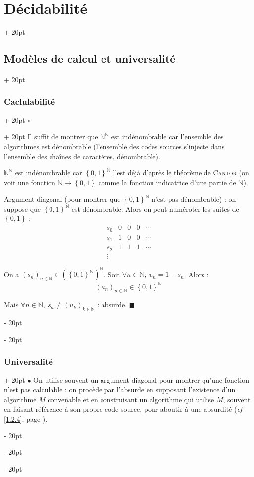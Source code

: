 \documentclass[a4paper, 12pt, twoside]{article}
\newcommand{\N}{\mathbb{N}} %
\newcommand{\lr}[1]{\left( #1 \right)}
\newcommand{\set}[1]{\left\{ #1 \right\}}
\newcommand{\ind}[1][20pt]{\advance\leftskip + #1}
\newcommand{\deind}[1][20pt]{\advance\leftskip - #1}
\newenvironment{indt}[2][20pt]{#2 \par \ind[#1]}{\par \deind} %
\newenvironment{proof}[1][{}]{\begin{indt}{$\square$ #1}}{$\blacksquare$ \end{indt}}
\begin{document}
\begin{indt}{\section{Décidabilité}}
\begin{indt}{\subsection{Modèles de calcul et universalité}}
\begin{indt}{\subsubsection{Caclulabilité}}
                \begin{proof}
                    Il suffit de montrer que $\N^\N$ est indénombrable car l'ensemble des algorithmes est dénombrable (l'ensemble des codes sources s'injecte dans l'ensemble des chaînes de caractères, dénombrable).

                    $\N^\N$ est indénombrable car $\set{0, 1}^\N$ l'est déjà d'après le théorème de \textsc{Cantor} (on voit une fonction $\N \longrightarrow \set{0, 1}$ comme la fonction indicatrice d'une partie de $\N$).

                    \vspace{12pt}
                    
                    Argument diagonal (pour montrer que $\set{0, 1}^\N$ n'est pas dénombrable) : on suppose que $\set{0, 1}^\N$ est dénombrable. Alors on peut numéroter les suites de $\set{0, 1}$ :
                    \[
                        \begin{array}{ccccc}
                            s_0 & 0 & 0 & 0 & \cdots
                            \\
                            s_1 & 1 & 0 & 0 & \cdots
                            \\
                            s_2 & 1 & 1 & 1 & \cdots
                            \\
                            \vdots
                        \end{array}
                    \]

                    On a $\lr{s_n}_{n \in \N} \in \lr{\set{0, 1}^\N}^\N$.
                    Soit $\forall n \in \N,\ u_n = 1 - s_n$. Alors :
                    \[
                        \lr{u_n}_{n \in \N} \in \set{0, 1}^\N
                    \]

                    Mais $\forall n \in \N,\ s_n \neq \lr{u_k}_{k \in \N}$ : absurde.
                \end{proof}
            \end{indt}

            \vspace{12pt}
            
            \begin{indt}{\subsubsection{Universalité}}
                $\bullet$ On utilise souvent un argument diagonal pour montrer qu'une fonction n'est pas calculable : on procède par l'absurde en supposant l'existence d'un algorithme $M$ convenable et en construisant un algorithme qui utilise $M$, souvent en faisant référence à son propre code source, pour aboutir à une absurdité (\textit{cf} \ref{1.2.4}, page \pageref{1.2.4}).


\end{indt}
\end{indt}
\end{indt}
\end{document}
